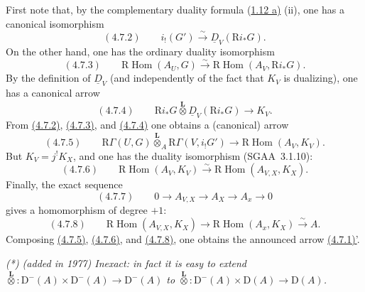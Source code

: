 \documentclass[11pt]{article}
\DeclareMathOperator{\Hom}{Hom}
\newcommand{\R}{\mathrm{R}}
\newcommand{\D}{\mathrm{D}}
\providecommand{\Hom}{\operatorname{Hom}}
\providecommand{\R}{\mathrm R}
\providecommand{\Hom}{\operatorname{Hom}}
\begin{document}
First note that, by the complementary duality formula (\hyperref[sga5:I:proposition:1.12]{1.12 a)} (ii), one has a canonical isomorphism
\label{sga5:I:equation:4.7.2}\[
(4.7.2)\qquad i_!(G')\xrightarrow{\sim}\underline{D}_V(\R i_*G).
\]
On the other hand, one has the ordinary duality isomorphism
\label{sga5:I:equation:4.7.3}\[
(4.7.3)\qquad \R\Hom(A_U,G)\xrightarrow{\sim}\R\Hom(A_V,\R i_*G).
\]
By the definition of $\underline{D}_V$ (and independently of the fact that $K_V$ is dualizing), one has a canonical arrow
\label{sga5:I:equation:4.7.4}\[
(4.7.4)\qquad \R i_*G\overset{\mathbf L}{\otimes}\underline{D}_V(\R i_*G)\longrightarrow K_V.
\]
From \hyperref[sga5:I:equation:4.7.2]{(4.7.2)}, \hyperref[sga5:I:equation:4.7.3]{(4.7.3)}, and \hyperref[sga5:I:equation:4.7.4]{(4.7.4)} one obtains a (canonical) arrow
\label{sga5:I:equation:4.7.5}\[
(4.7.5)\qquad \R\Gamma(U,G)\overset{\mathbf L}{\otimes}_A\R\Gamma(V,i_!G')\longrightarrow \R\Hom(A_V,K_V).
\]
But $K_V=j^!K_X$, and one has the duality isomorphism (SGAA~3.1.10):
\label{sga5:I:equation:4.7.6}\[
(4.7.6)\qquad \R\Hom(A_V,K_V)\xrightarrow{\sim}\R\Hom(A_{V,X},K_X).
\]
Finally, the exact sequence
\label{sga5:I:equation:4.7.7}\[
(4.7.7)\qquad 0\longrightarrow A_{V,X}\longrightarrow A_X\longrightarrow A_x\longrightarrow 0
\]
gives a homomorphism of degree $+1$:
\label{sga5:I:equation:4.7.8}\[
(4.7.8)\qquad \R\Hom(A_{V,X},K_X)\longrightarrow \R\Hom(A_x,K_X)\xrightarrow{\sim}A.
\]
Composing \hyperref[sga5:I:equation:4.7.5]{(4.7.5)}, \hyperref[sga5:I:equation:4.7.6]{(4.7.6)}, and \hyperref[sga5:I:equation:4.7.8]{(4.7.8)}, one obtains the announced arrow \hyperref[sga5:I:equation:4.7.1:2]{(4.7.1)'}.

\emph{(*) (added in 1977) Inexact: in fact it is easy to extend $\overset{\mathbf L}{\otimes}:\D^-(A)\times\D^-(A)\to\D^-(A)$ to $\overset{\mathbf L}{\otimes}:\D^-(A)\times\D(A)\to\D(A)$.}
\end{document}
